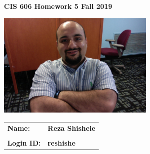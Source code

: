 \documentclass[11pt]{article}
\begin{document}
\thispagestyle{plain}

\begin{center}
{\Large \bf CIS 606 \hfil Homework 5 \hfil Fall 2019} \\%
\end{center}

\vskip 1in 

\centerline{\includegraphics[width=3in]{photo.jpg}}

\vskip 0.5in 


\begin{center}
\begin{tabular}{ll}
{\bf Name:}     & {\bf Reza Shisheie } \\ \\
{\bf Login ID:} & {\bf reshishe }   
\end{tabular}
\end{center}

\newpage
\end{document}
